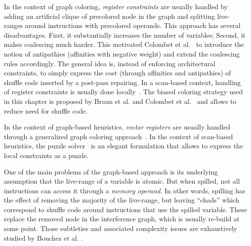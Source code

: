 {%
In the context of graph coloring, \emph{register constraints} are usually handled by adding an artificial clique of precolored node in the graph and splitting live-ranges around instructions with precolored operands.
This approach has several disadvantages.
First, it substantially increases the number of variables;
Second, it makes coalescing much harder.
This motivated Colombet et al.~\cite{ColombetOct11} to introduce the notion of antipathies (affinities with negative weight) and extend the coalescing rules accordingly.
The general idea is, instead of enforcing architectural constraints, to simply express the cost (through affinities and antipathies) of shuffle code inserted by a post-pass repairing.
In a scan-based context, handling of register constraints is usually done locally~\cite{linear-pfeifer,sarkar2007extended}.
The biased coloring strategy used in this chapter is proposed by Braun et al. and Colombet et al.~\cite{braun2010preference,ColombetOct11} and allows to reduce need for shuffle code.

In the context of graph-based heuristics, \emph{vector registers} are usually handled through a generalized graph coloring approach~\cite{Smith04,Tavares}.
In the context of scan-based heuristics, the puzzle solver~\cite{Pereira:2008:PLDI} is an elegant formulation that allows to express the local constraints as a puzzle. 

One of the main problems of the graph-based approach is its underlying assumption that the live-range of a variable is atomic.
But when spilled, not all instructions can access it through a \emph{memory operand}.
In other words, spilling has the effect of removing the majority of the live-range, but leaving ``chads'' which correspond to shuffle code around instructions that use the spilled variable.
These replace the removed node in the interference graph, which is usually re-build at some point.
Those subtleties and associated complexity issues are exhaustively studied by Bouchez et al. \cite{Bouchez07b}.

}
